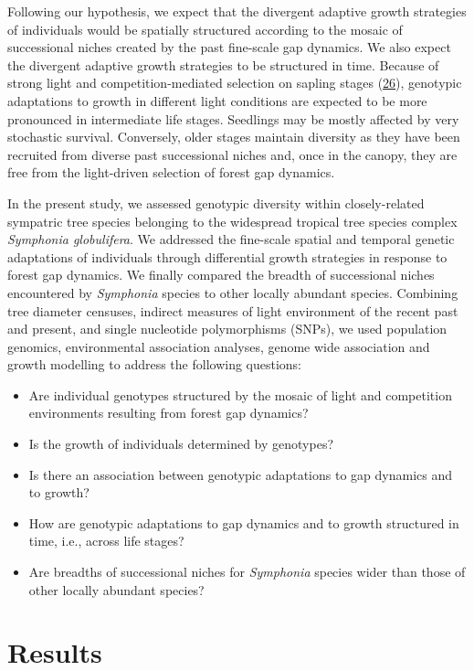 \documentclass[
]{article}
\providecommand{\tightlist}{%
  \setlength{\itemsep}{0pt}\setlength{\parskip}{0pt}}
\begin{document}
Following our hypothesis, we expect that the divergent adaptive growth strategies of individuals would be spatially structured according to the mosaic of successional niches created by the past fine-scale gap dynamics.
We also expect the divergent adaptive growth strategies to be structured in time.
Because of strong light and competition-mediated selection on sapling stages (\protect\hyperlink{ref-Lewis2000}{26}),
genotypic adaptations to growth in different light conditions are expected to be more pronounced in intermediate life stages.
Seedlings may be mostly affected by very stochastic survival.
Conversely, older stages maintain diversity as they have been recruited from diverse past successional niches and,
once in the canopy, they are free from the light-driven selection of forest gap dynamics.

In the present study, we assessed genotypic diversity within closely-related sympatric tree species belonging to the widespread tropical tree species complex \emph{Symphonia globulifera}.
We addressed the fine-scale spatial and temporal genetic adaptations of individuals through differential growth strategies in response to forest gap dynamics.
We finally compared the breadth of successional niches encountered by \emph{Symphonia} species to other locally abundant species.
Combining tree diameter censuses, indirect measures of light environment of the recent past and present, and single nucleotide polymorphisms (SNPs),
we used population genomics, environmental association analyses, genome wide association and growth modelling to address the following questions:

\begin{itemize}
\tightlist
\item
  Are individual genotypes structured by the mosaic of light and competition environments resulting from forest gap dynamics?
\item
  Is the growth of individuals determined by genotypes?
\item
  Is there an association between genotypic adaptations to gap dynamics and to growth?
\item
  How are genotypic adaptations to gap dynamics and to growth structured in time, i.e., across life stages?
\item
  Are breadths of successional niches for \emph{Symphonia} species wider than those of other locally abundant species?
\end{itemize}

\hypertarget{results}{%
\section{Results}\label{results}}
\end{document}
